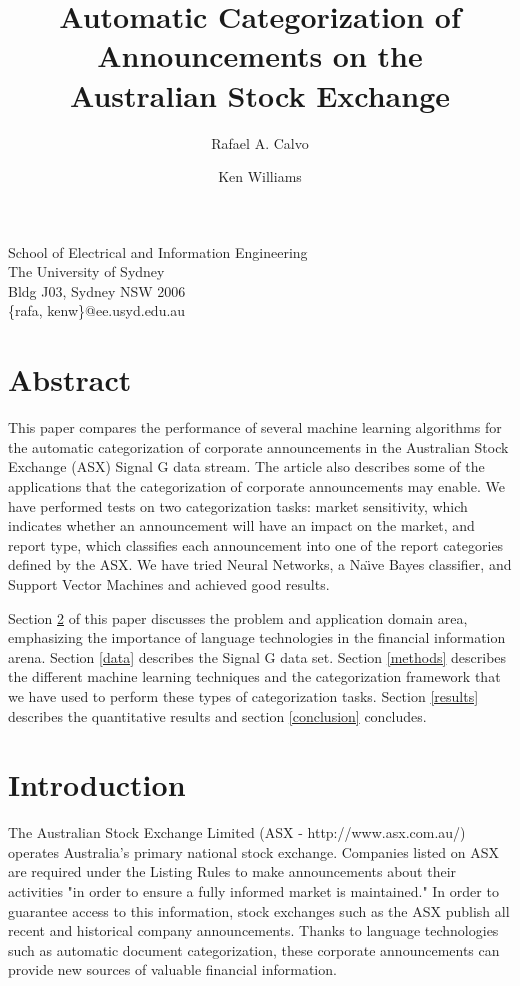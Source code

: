 \documentclass[a4paper,twocolumn]{article}
\author{Rafael A. Calvo \and Ken Williams}
\title{Automatic Categorization of Announcements on the\\ Australian Stock Exchange}
\begin{document}
\maketitle

\begin{center}
School of Electrical and Information Engineering\\
The University of Sydney\\
Bldg J03, Sydney NSW 2006\\
\{rafa, kenw\}@ee.usyd.edu.au

\end{center}

\section{Abstract}

This paper compares the performance of several machine learning
algorithms for the automatic categorization of corporate announcements
in the Australian Stock Exchange (ASX) Signal G data stream. The
article also describes some of the applications that the
categorization of corporate announcements may enable. We have
performed tests on two categorization tasks: market sensitivity, which
indicates whether an announcement will have an impact on the market,
and report type, which classifies each announcement into one of the
report categories defined by the ASX. We have tried Neural Networks, a
Na\"\i ve Bayes classifier, and Support Vector Machines and achieved
good results.

Section \ref{introduction} of this paper discusses the problem and
application domain area, emphasizing the importance of language
technologies in the financial information arena. Section \ref{data}
describes the Signal G data set.  Section \ref{methods} describes the
different machine learning techniques and the categorization framework
that we have used to perform these types of categorization
tasks. Section \ref{results} describes the quantitative results and
section \ref{conclusion} concludes.

\section{Introduction}
\label{introduction}

The Australian Stock Exchange Limited (ASX - http://www.asx.com.au/)
operates Australia's primary national stock exchange.  Companies
listed on ASX are required under the Listing Rules to make
announcements about their activities "in order to ensure a fully
informed market is maintained." \cite{asx:02} In order to guarantee
access to this information, stock exchanges such as the ASX publish
all recent and historical company announcements.  Thanks to language
technologies such as automatic document categorization, these
corporate announcements can provide new sources of valuable financial
information.
\end{document}

